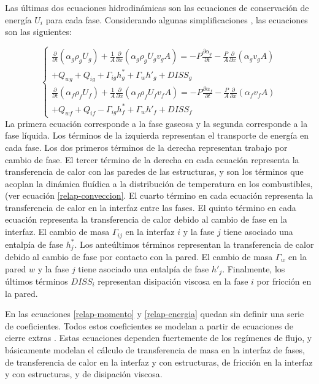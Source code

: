 Las últimas dos ecuaciones hidrodinámicas son las ecuaciones de conservación de energía $U_i$ para cada fase.
Considerando algunas simplificaciones \cite{manual-relap-modelos}, las ecuaciones son las siguientes:

\begin{equation}
\left \{
\begin{array}{r}
\frac{\partial}{\partial t} \left( \alpha_g \rho_g U_g\right) + \frac{1}{A} \frac{\partial}{\partial x} \left ( \alpha_g \rho_g U_g v_g A \right ) = 
-P \frac{\partial \alpha_g}{\partial t} - \frac{P}{A} \frac{\partial}{\partial x} \left( \alpha_g v_g A \right ) \\
+ Q_{wg} + Q_{ig} + \Gamma_{ig}h^*_g + \Gamma_w {h}'_g + DISS_g \\

\frac{\partial}{\partial t} \left( \alpha_f \rho_f U_f\right) + \frac{1}{A} \frac{\partial}{\partial x} \left ( \alpha_f \rho_f U_f v_f A \right ) = 
-P \frac{\partial \alpha_f}{\partial t} - \frac{P}{A} \frac{\partial}{\partial x} \left( \alpha_f v_f A \right ) \\
+ Q_{wf} + Q_{if} - \Gamma_{ig}h^*_f + \Gamma_w {h}'_f + DISS_f
\end{array}
\right .
\label{relap-energia}
\end{equation}
La primera ecuación corresponde a la fase gaseosa y la segunda corresponde a la fase líquida.
Los términos de la izquierda representan el transporte de energía en cada fase.
Los dos primeros términos de la derecha representan trabajo por cambio de fase.
El tercer término de la derecha en cada ecuación representa la transferencia de calor con las paredes de las estructuras,
y son los términos que acoplan la dinámica fluídica a la distribución de temperatura en los combustibles, (ver ecuación \ref{relap-conveccion}.
El cuarto término en cada ecuación representa la transferencia de calor en la interfaz entre las fases.
El quinto término en cada ecuación representa la transferencia de calor debido al cambio de fase en la interfaz.
El cambio de masa $\Gamma_{ij}$ en la interfaz $i$ y la fase $j$ tiene asociado una entalpía de fase $h^*_j$.
Los anteúltimos términos representan la transferencia de calor debido al cambio de fase por contacto con la pared.
El cambio de masa $\Gamma_{w}$ en la pared $w$ y la fase $j$ tiene asociado una entalpía de fase ${h}'_j$.
Finalmente, los últimos términos $DISS_i$ representan disipación viscosa en la fase $i$ por fricción en la pared.

En las ecuaciones \ref{relap-momento} y \ref{relap-energia} quedan sin definir una serie de coeficientes.
Todos estos coeficientes se modelan a partir de ecuaciones de cierre extras \cite{manual-relap-modelos}.
Estas ecuaciones dependen fuertemente de los regímenes de flujo, y básicamente modelan
el cálculo de transferencia de masa en la interfaz de fases,
de transferencia de calor en la interfaz y con estructuras,
de fricción en la interfaz y con estructuras, y
de disipación viscosa.

